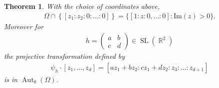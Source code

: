 \documentclass[12pt]{amsart}
\theoremstyle{plain}
\newtheorem{theorem}[proposition]{Theorem}
\theoremstyle{definition}
\theoremstyle{remark}
\begin{document}
\begin{theorem}
\label{thm:blow_up}
With the choice of coordinates above,
\begin{align*}
\Omega \cap \left\{ [ z_1: z_2 : 0 : \dots :0] \right\}= \{ [1:z: 0, \dots: 0] : \mathrm{Im}(z) >0\}.
\end{align*}
Moreover for 
\begin{align*}
h = \begin{pmatrix} a & b \\ c & d \end{pmatrix} \in \operatorname{SL}(\operatorname{\mathbb{R}}^2)
\end{align*}
the projective transformation defined by 
\begin{align*}
\psi_h \cdot [z_1, \dots, z_d] = [ az_1 + bz_2 : cz_1 + d z_2 : z_3 : \dots : z_{d+1}]
\end{align*}
is in $\operatorname{Aut}_0(\Omega)$.
\end{theorem}
\end{document}
